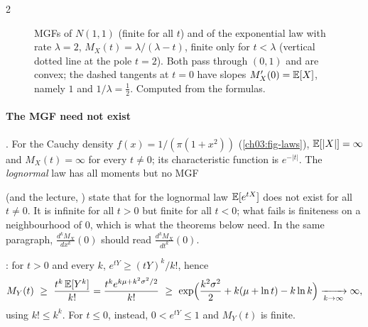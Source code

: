 \begin{paracol}{2}
\begin{figure}[!htb]
\centering
{}
\caption{MGFs of $N(1,1)$ (finite for all $t$) and of the exponential law with rate $\lambda=2$, $M_X(t)=\lambda/(\lambda-t)$, finite only for $t<\lambda$
(vertical dotted line at the pole $t=2$). Both pass through $(0,1)$ and are convex; the dashed tangents at $t=0$ have slopes $M_X'(0)=\mathbb{E}[X]$, namely $1$ and $1/\lambda=\tfrac12$.
Computed from the formulas.}\label{ch03:fig-mgf}
\end{figure}

\paragraph{The MGF need not exist} . For the Cauchy density $f(x)=1/(\pi(1+x^2))$ (\cref{ch03:fig-laws}), $\mathbb{E}[|X|]=\infty$
and $M_X(t)=\infty$ for every $t\ne0$; its characteristic function is $e^{-|t|}$. The \emph{lognormal} law has
all moments but no MGF \begin{coursenote}
 (and the lecture, ) state that for the lognormal law $\mathbb{E}[e^{tX}]$ does not
exist for all $t\neq0$. It is infinite for all $t>0$ but finite for all $t<0$; what fails is finiteness on a
neighbourhood of $0$, which is what the theorems below need. In the same paragraph,
$\frac{d^kM_X}{dx^k}(0)$ should read $\frac{d^kM_X}{dt^k}(0)$.
\end{coursenote}: for $t>0$ and every $k$, $e^{tY}\ge(tY)^k/k!$, hence
\[
  M_Y(t)\ \ge\ \frac{t^k\,\E[Y^k]}{k!}=\frac{t^k e^{k\mu+k^2\sigma^2/2}}{k!}\ \ge\ \exp\Bigl(\frac{k^2\sigma^2}{2}+k(\mu+\ln t)-k\ln k\Bigr)\xrightarrow[k\to\infty]{}\infty ,
\]
using $k!\le k^k$. For $t\le0$, instead, $0<e^{tY}\le1$ and $M_Y(t)$ is finite.


\end{paracol}
